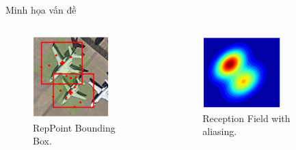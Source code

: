 \documentclass[11pt]{beamer}
\theoremstyle{definition}
\theoremstyle{plain}
\theoremstyle{plain}
\theoremstyle{remark}
\begin{document}
\begin{frame}{Minh họa vấn đề}
	\begin{columns}[c] %
		\begin{figure}
			\centering
			\includegraphics[width=3cm]{reppoint_bouding_box.jpg}
			\caption{RepPoint Bounding Box.}
		\end{figure}
		
		\begin{figure}
			\centering
			\includegraphics[width=3cm]{reception_field_w_aliasing.jpg}
			\caption{Reception Field with aliasing.}
		\end{figure}
	\end{columns}
\end{frame}
\end{document}
